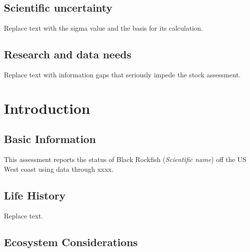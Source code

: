 \documentclass[11pt,
  english,
  letterpaper,
]{article}
\begin{document}
\hypertarget{scientific-uncertainty}{%
\subsection*{Scientific uncertainty}\label{scientific-uncertainty}}

Replace text with the sigma value and the basis for its calculation.

\hypertarget{research-and-data-needs}{%
\subsection*{Research and data needs}\label{research-and-data-needs}}

Replace text with information gaps that seriously impede the stock assessment.

\pagebreak
\setlength{\parskip}{5mm plus1mm minus1mm}
\setcounter{page}{1}
\renewcommand{\thefigure}{\arabic{figure}}
\renewcommand{\thetable}{\arabic{table}}
\setcounter{table}{0}
\setcounter{figure}{0}

\hypertarget{introduction}{%
\section{Introduction}\label{introduction}}

\hypertarget{basic-information}{%
\subsection{Basic Information}\label{basic-information}}

This assessment reports the status of Black Rockfish (\emph{Scientific name}) off the US West coast using data through xxxx.

\hypertarget{life-history}{%
\subsection{Life History}\label{life-history}}

Replace text.

\hypertarget{ecosystem-considerations-1}{%
\subsection{Ecosystem Considerations}\label{ecosystem-considerations-1}}
\end{document}
